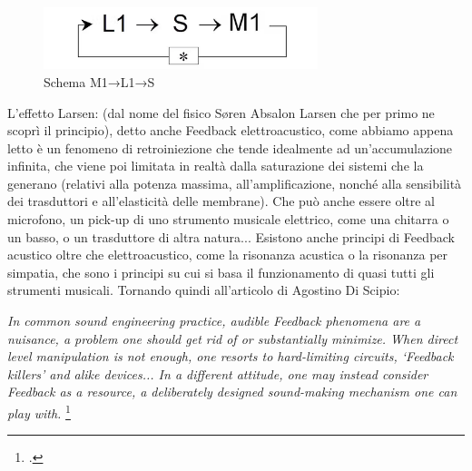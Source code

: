 \begin{figure}[h!]
    \begin{center}
        \vspace{0.5cm}
        \includegraphics[width=8cm]{figures/larsen_Feedback_scheme.png}
        \caption{Schema M1→L1→S}
        \vspace{0.5cm}
        \end{center}
\end{figure} 

L'effetto Larsen: (dal nome del fisico Søren Absalon Larsen
che per primo ne scoprì il principio), detto anche Feedback elettroacustico,
come abbiamo appena letto è un fenomeno di retroiniezione che tende idealmente 
ad un'accumulazione infinita, che viene poi limitata in realtà dalla saturazione dei sistemi 
che la generano (relativi alla potenza massima, all'amplificazione, nonché alla sensibilità dei
trasduttori e all'elasticità delle membrane). Che può anche essere oltre al microfono, un
pick-up di uno strumento musicale elettrico, come una chitarra o un basso, o un trasduttore di
altra natura... 
Esistono anche principi di Feedback acustico oltre che elettroacustico, 
come la risonanza acustica o la risonanza per simpatia,
che sono i principi su cui si basa il funzionamento di quasi tutti gli strumenti musicali.
Tornando quindi all'articolo di Agostino Di Scipio:

\begin{center}
\vspace{0.5cm}
\textit{In common sound engineering practice, audible Feedback phenomena are a nuisance, a problem one
should get rid of or substantially minimize. When direct level manipulation is not enough, one
resorts to hard-limiting circuits, ‘Feedback killers’ and alike devices... 
In a different attitude, one may instead consider Feedback as
a resource, a deliberately designed sound-making mechanism one can play with.} \footcite{di_scipio_relational_2022}
\vspace{0.5cm}
\end{center}

